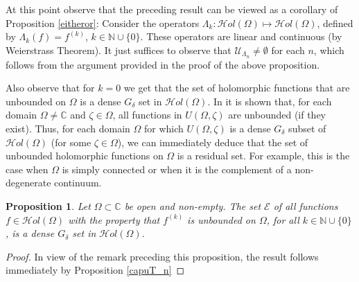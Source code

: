 \documentclass[11pt,twoside,a4paper]{article}
\newtheorem{proposition}[theorem]{Proposition}
\theoremstyle{remark}
\def\d{\delta}
\newcommand{\hol}{{\mathcal Hol}}
\newcommand{\holo}{{\mathcal Hol}(\Omega)}
\begin{document}
 At this point observe that the preceding result can be viewed as a corollary of Proposition \ref{eitheror}: Consider the operators $\Lambda_k: \hol(\Omega) \mapsto \hol (\Omega)$, defined by $\Lambda_k(f)= f^{(k)}$, $k \in \mathbb{N} \cup \{0\}$. These operators are linear and continuous (by Weierstrass Theorem). It just suffices to observe that $\mathcal{U}_{\Lambda_n} \neq \emptyset$ for each $n$, which follows from the argument provided in the proof of the above proposition.
 \par
 Also observe that for $k=0$ we get that the set of holomorphic functions that are unbounded on $\Omega$ is a dense $G_\d$ set in $\holo$. In \cite{gardiner2014boundary} it is shown that, for each domain $\Omega \neq \mathbb{C}$ and $\zeta \in \Omega$, all functions in $U(\Omega,\zeta)$ are unbounded (if they exist). Thus, for each domain $\Omega$ for which $U(\Omega, \zeta)$ is a dense $G_\d$ subset of $\holo$ (for some $\zeta \in \Omega$), we can immediately deduce that the set of unbounded holomorphic functions on $\Omega$ is a residual set. For example, this is the case when $\Omega$ is simply connected or when it is the complement of a non-degenerate continuum.
  \begin{proposition}
  \label{e}
  Let $\Omega \subset \mathbb{C}$ be open and non-empty. The set $\mathcal{E}$ of all functions $f \in \hol(\Omega)$ with the property that $f^{(k)}$ is unbounded on $\Omega$, for all $k \in \mathbb{N} \cup \{0\}$, is a dense $G_{\delta}$ set in $\hol(\Omega)$.
\end{proposition}

\begin{proof}
  In view of the remark preceding this proposition, the result follows immediately by Proposition \ref{capuT_n}
\end{proof}
\end{document}
